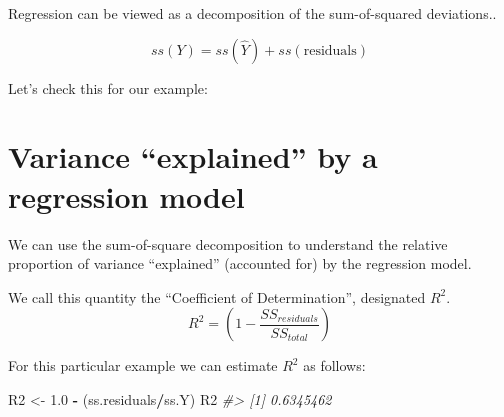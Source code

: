 \documentclass[]{book}
\newenvironment{Shaded}{\begin{snugshade}}{\end{snugshade}}
\newcommand{\CommentTok}[1]{\textcolor[rgb]{0.56,0.35,0.01}{\textit{#1}}}
\newcommand{\DecValTok}[1]{\textcolor[rgb]{0.00,0.00,0.81}{#1}}
\newcommand{\FloatTok}[1]{\textcolor[rgb]{0.00,0.00,0.81}{#1}}
\newcommand{\KeywordTok}[1]{\textcolor[rgb]{0.13,0.29,0.53}{\textbf{#1}}}
\newcommand{\NormalTok}[1]{#1}
\newcommand{\OperatorTok}[1]{\textcolor[rgb]{0.81,0.36,0.00}{\textbf{#1}}}
\newcommand{\StringTok}[1]{\textcolor[rgb]{0.31,0.60,0.02}{#1}}
\theoremstyle{definition}
\theoremstyle{definition}
\theoremstyle{definition}
\theoremstyle{remark}
\begin{document}
Regression can be viewed as a decomposition of the sum-of-squared
deviations..

\[
ss(Y) = ss(\hat{Y}) + ss(\mbox{residuals})
\]

Let's check this for our example:

\begin{Shaded}
\end{Shaded}

\hypertarget{variance-explained-by-a-regression-model}{%
\section{Variance ``explained'' by a regression
model}\label{variance-explained-by-a-regression-model}}

We can use the sum-of-square decomposition to understand the relative
proportion of variance ``explained'' (accounted for) by the regression
model.

We call this quantity the ``Coefficient of Determination'', designated
\(R^2\).\\
\[
R^2 = \left( 1 - \frac{SS_{residuals}}{SS_{total}} \right)
\]

For this particular example we can estimate \(R^2\) as follows:

\begin{Shaded}
\begin{Highlighting}[]
\NormalTok{R2 <-}\StringTok{ }\FloatTok{1.0} \OperatorTok{-}\StringTok{ }\NormalTok{(ss.residuals}\OperatorTok{/}\NormalTok{ss.Y)}
\NormalTok{R2}
\CommentTok{#> [1] 0.6345462}
\end{Highlighting}
\end{Shaded}
\end{document}
